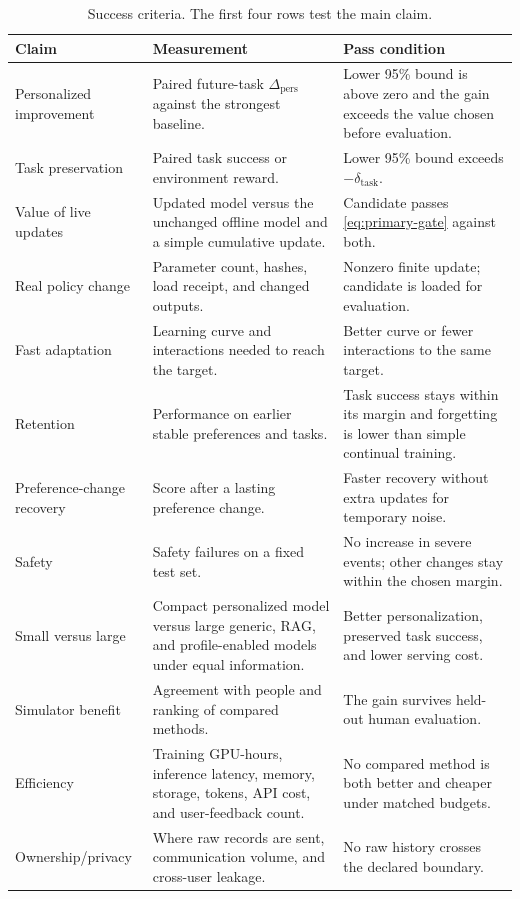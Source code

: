 \documentclass[11pt]{article}
\begin{document}
\begin{table}[t]
  \centering
  \caption{Success criteria.  The first four rows test the main claim.}
  \label{tab:success}
  \small
  \begin{tabularx}{\textwidth}{@{}L{0.18\textwidth}L{0.27\textwidth}Y@{}}
    \toprule
    Claim & Measurement & Pass condition \\
    \midrule
    Personalized improvement &
    Paired future-task $\Delta_{\mathrm{pers}}$ against the strongest baseline. &
    Lower 95\% bound is above zero and the gain exceeds the value chosen before
    evaluation. \\
    Task preservation &
    Paired task success or environment reward. &
    Lower 95\% bound exceeds $-\delta_{\mathrm{task}}$. \\
    Value of live updates &
    Updated model versus the unchanged offline model and a simple cumulative
    update. &
    Candidate passes \cref{eq:primary-gate} against both. \\
    Real policy change &
    Parameter count, hashes, load receipt, and changed outputs. &
    Nonzero finite update; candidate is loaded for evaluation. \\
    Fast adaptation &
    Learning curve and interactions needed to reach the target. &
    Better curve or fewer interactions to the same target. \\
    Retention &
    Performance on earlier stable preferences and tasks. &
    Task success stays within its margin and forgetting is lower than simple
    continual training. \\
    Preference-change recovery &
    Score after a lasting preference change. &
    Faster recovery without extra updates for temporary noise. \\
    Safety &
    Safety failures on a fixed test set. &
    No increase in severe events; other changes stay within the chosen margin. \\
    Small versus large &
    Compact personalized model versus large generic, RAG, and profile-enabled
    models under equal information. &
    Better personalization, preserved task success, and lower serving cost. \\
    Simulator benefit &
    Agreement with people and ranking of compared methods. &
    The gain survives held-out human evaluation. \\
    Efficiency &
    Training GPU-hours, inference latency, memory, storage, tokens, API cost,
    and user-feedback count. &
    No compared method is both better and cheaper under matched budgets. \\
    Ownership/privacy &
    Where raw records are sent, communication volume, and cross-user leakage. &
    No raw history crosses the declared boundary. \\
    \bottomrule
  \end{tabularx}
\end{table}
\end{document}
